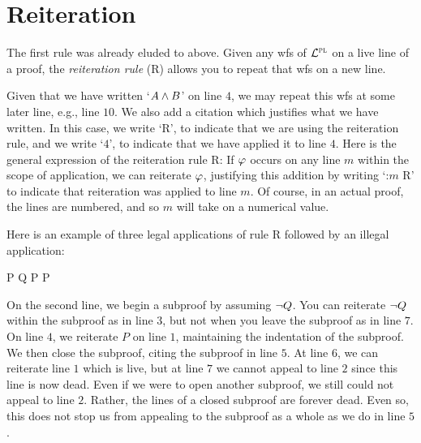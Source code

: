 \section{Reiteration}
\label{sec:reiteration}

The first rule was already eluded to above.
Given any wfs of $\mathcal{L}^{\textsc{pl}}$ on a live line of a proof, the \emph{reiteration rule} (R) allows you to repeat that wfs on a new line.
\begin{fitchproof}
	\have[$\vdots$]{}{\vdots}
	\have[$\vdots$]{}{\vdots}
	 
\end{fitchproof}
Given that we have written `$A \wedge B$' on line $4$, we may repeat this wfs at some later line, e.g., line $10$.
We also add a citation which justifies what we have written.
In this case, we write `R', to indicate that we are using the reiteration rule, and we write `$4$', to indicate that we have applied it to line $4$.
Here is the general expression of the reiteration rule R:
If $\varphi$ occurs on any line $m$ within the scope of application, we can reiterate $\varphi$, justifying this addition by writing `:$m$ R' to indicate that reiteration was applied to line $m$.
Of course, in an actual proof, the lines are numbered, and so $m$ will take on a numerical value.

Here is an example of three legal applications of rule R followed by an illegal application:

\begin{fitchproof}
		 \pr{}
		\open
			 \as{}
			 
			 {P} 
			\close
       {\enot Q \eif P} 
       {P} 
	\end{fitchproof}

On the second line, we begin a subproof by assuming $\neg Q$.
You can reiterate $\neg Q$ within the subproof as in line $3$, but not when you leave the subproof as in line $7$.
On line $4$, we reiterate $P$ on line $1$, maintaining the indentation of the subproof.
We then close the subproof, citing the subproof in line $5$.
At line $6$, we can reiterate line $1$ which is live, but at line $7$ we cannot appeal to line $2$ since this line is now dead.
Even if we were to open another subproof, we still could not appeal to line $2$.
Rather, the lines of a closed subproof are forever dead. 
Even so, this does not stop us from appealing to the subproof as a whole as we do in line $5$.



